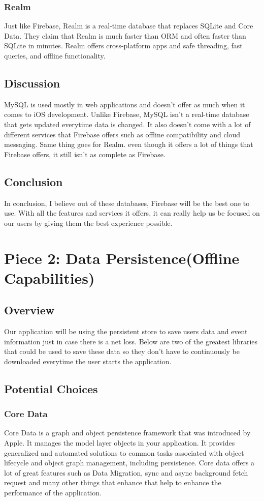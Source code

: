 \documentclass[onecolumn, draftclsnofoot,10pt, compsoc]{IEEEtran}
\begin{document}
\subsubsection{Realm\cite{Realm}}
Just like Firebase, Realm is a real-time database that replaces SQLite and Core Data. They claim that Realm is much faster than ORM and often faster than SQLite in minutes. Realm offers cross-platform apps and safe threading, fast queries, and offline functionality. 

\subsection{Discussion}
MySQL is used mostly in web applications and doesn't offer as much when it comes to iOS development. Unlike Firebase, MySQL isn't a real-time database that gets updated everytime data is changed. It also doesn't come with a lot of different services that Firebase offers such as offline compatibility and cloud messaging. Same thing goes for Realm. even though it offers a lot of things that Firebase offers, it still isn't as complete as Firebase. 

\subsection{Conclusion}
In conclusion, I believe out of these databases, Firebase will be the best one to use. With all the features and services it offers, it can really help us be focused on our users by giving them the best experience possible. 

\section{Piece 2: Data Persistence(Offline Capabilities)}
\subsection{Overview}
Our application will be using the persistent store to save users data and event information just in case there is a net loss. Below are two of the greatest libraries that could be used to save these data so they don't have to continuously be downloaded everytime the user starts the application.

\subsection{Potential Choices}
\subsubsection{Core Data\cite{CoreData}}
\par Core Data is a graph and object persistence framework that was introduced by Apple. It manages the model layer objects in your application. It provides generalized and automated solutions to common tasks associated with object lifecycle and object graph management, including persistence. Core data offers a lot of great features such as Data Migration, sync and async background fetch request and many other things that enhance that help to enhance the performance of the application.
\end{document}
